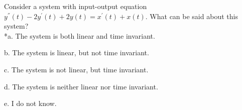 
Consider a system with input-output equation $y^{''}(t)-2y^{'}(t)+2y(t)=x^{'}(t)+x(t)$. What can be said about this system?\\

*a. The system is both linear and time invariant.

b. The system is linear, but not time invariant.

c. The system is not linear, but time invariant.

d. The system is neither linear nor time invariant.

e. I do not know.\\
